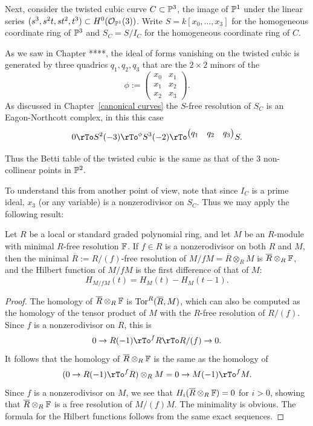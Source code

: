 \begin{example}
 Next, consider the twisted cubic curve $C\subset \PP^{3}$, the image of $\PP^{1}$ under the linear series
 $(s^{3}, s^{2}t, st^{2}, t^{3})\subset H^{0}(\sO_{\PP^{1}}(3))$. Write $S = k[x_{0},\dots,x_{3}]$ for the homogeneous coordinate ring of $\PP^{3}$ and $S_{C} = S/I_{C}$ for the homogeneous coordinate ring of $C$.

As we saw in Chapter ****, the ideal of forms vanishing on the twisted cubic is generated by three quadrics
$q_{1}, q_{2}, q_{3}$ that are the $2\times 2$ minors of the
$$
\phi := \begin{pmatrix}
 x_{0}&x_{1}\\
 x_{1}&x_{2}\\
 x_{2}&x_{3}
\end{pmatrix}.
$$
As discussed in Chapter~\ref{canonical curves} the $S$-free resolution of $S_{C}$ is an Eagon-Northcott complex, in this this case
$$
0 \rTo S^{2}(-3) \rTo^{\phi} S^{3}(-2) \rTo^{
\begin{pmatrix}
q_{1}&q_{2}&q_{3} 
\end{pmatrix}
} S.
$$

Thus the Betti table of the twisted cubic is the same as that of the 3 non-collinear points in $\PP^{2}.$

To understand this from another point of view, note that since $I_{C}$ is a prime ideal, $x_{3}$ (or any variable) is a nonzerodivisor on $S_{C}$. Thus we may apply the following result:

\begin{proposition}\label{reduction modulo a nzd}
Let $R$ be a local or standard graded polynomial ring, and let 
$M$ be an $R$-module with minimal $R$-free resolution $\FF$.
If $f\in R$ is a nonzerodivisor on both $R$ and $M$, then the minimal $\overline R:=R/(f)$-free resolution of
$M/fM = \overline R \otimes_{R}M$ is $\overline R \otimes_{R}\FF$, and the Hilbert function of $M/fM$ is
the first difference of that of $M$:  
$$
H_{M/fM}(t) = H_{M}(t) - H_{M}(t-1).
$$
\end{proposition}
\begin{proof}
 The homology of $\overline R \otimes_{R}\FF$ is $\Tor^{R}(\overline R,M)$, which can also be computed as the homology of the tensor product of $M$ with the $R$-free resolution of $R/(f)$. Since $f$ is a nonzerodivisor on $R$, this is
$$
0\to R(-1)\rTo^{f} R \rTo R/(f) \to 0.
$$
It follows that the homology of $\overline R \otimes_{R}\FF$ is the same as the homology of
$$
(0\to R(-1)\rTo^{f} R)\otimes_{R}M  = 0\to M(-1)\rTo^{f} M.
$$
Since $f$ is a nonzerodivisor on $M$, we see that $H_{i}( \overline R \otimes_{R}\FF) = 0$ for $i>0$, showing that $\overline R \otimes_{R}\FF$
is a free resolution of $M/(f)M$. The minimality is obvious. The formula for the Hilbert functions follows from the same exact sequences.
\end{proof}


\end{example}
